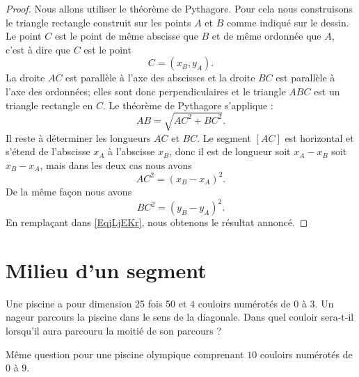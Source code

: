 \begin{proof}
    Nous allons utiliser le théorème de Pythagore. Pour cela nous construisons le triangle rectangle construit sur les points \( A\) et \( B\) comme indiqué sur le dessin. Le point \( C\) est le point de même abscisse que \( B\) et de même ordonnée que \( A\), c'est à dire que \( C\) est le point
    \begin{equation}
        C=(x_B,y_A).
    \end{equation}
    La droite \( AC\) est parallèle à l'axe des abscisses et la droite \( BC\) est parallèle à l'axe des ordonnées; elles sont donc perpendiculaires et le triangle \( ABC\) est un triangle rectangle en \( C\). Le théorème de Pythagore s'applique :
    \begin{equation}    \label{EqjLjEKr}
       AB =\sqrt{ AC^2+BC^2}.
    \end{equation}
    Il reste à déterminer les longueurs \(  AC \) et \(  BC \). Le segment \( [AC]\) est horizontal et s'étend de l'abscisse \( x_A\) à l'abscisse \( x_B\), donc il est de longueur soit \( x_A-x_B\) soit \( x_B-x_A\), mais dans les deux cas nous avons
    \begin{equation}
         AC^2=(x_B-x_A)^2.
    \end{equation}
    De la même façon nous avons 
    \begin{equation}
         BC^2=(y_B-y_A)^2.
    \end{equation}
    En remplaçant dans \eqref{EqjLjEKr}, nous obtenons le résultat annoncé.
\end{proof}

\section{Milieu d'un segment}



\begin{Aprojeter}

    Une piscine a pour dimension \unit{25}{\meter} fois \unit{50}{\meter} et \( 4\) couloirs numérotés de \( 0\) à \( 3\). Un nageur parcours la piscine dans le sens de la diagonale. Dans quel couloir sera-t-il lorsqu'il aura parcouru la moitié de son parcours ?

    Même question pour une piscine olympique comprenant \( 10\) couloirs numérotés de \( 0\) à \( 9\).

    
\end{Aprojeter}

